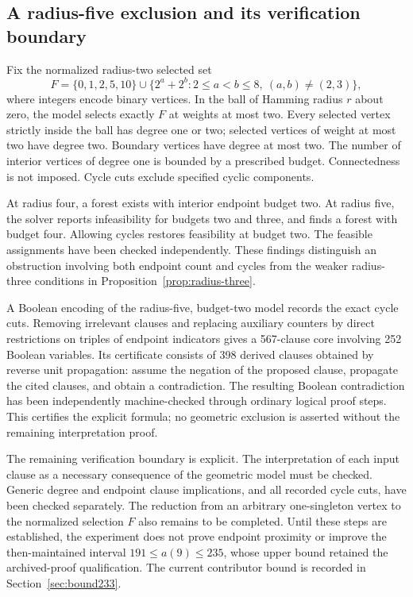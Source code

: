 \documentclass[11pt,a4paper]{article}
\theoremstyle{definition}
\theoremstyle{remark}
\begin{document}
\subsection{A radius-five exclusion and its verification boundary}
Fix the normalized radius-two selected set
\[
F=\{0,1,2,5,10\}\cup
\{2^a+2^b:2\le a<b\le8,\ (a,b)\ne(2,3)\},
\]
where integers encode binary vertices. In the ball of Hamming radius $r$ about zero, the model selects exactly $F$ at weights at most two. Every selected vertex strictly inside the ball has degree one or two; selected vertices of weight at most two have degree two. Boundary vertices have degree at most two. The number of interior vertices of degree one is bounded by a prescribed budget. Connectedness is not imposed. Cycle cuts exclude specified cyclic components.

At radius four, a forest exists with interior endpoint budget two. At radius five, the solver reports infeasibility for budgets two and three, and finds a forest with budget four. Allowing cycles restores feasibility at budget two. The feasible assignments have been checked independently. These findings distinguish an obstruction involving both endpoint count and cycles from the weaker radius-three conditions in Proposition~\ref{prop:radius-three}.

A Boolean encoding of the radius-five, budget-two model records the exact cycle cuts. Removing irrelevant clauses and replacing auxiliary counters by direct restrictions on triples of endpoint indicators gives a 567-clause core involving 252 Boolean variables. Its certificate consists of 398 derived clauses obtained by reverse unit propagation: assume the negation of the proposed clause, propagate the cited clauses, and obtain a contradiction. The resulting Boolean contradiction has been independently machine-checked through ordinary logical proof steps. This certifies the explicit formula; no geometric exclusion is asserted without the remaining interpretation proof.

The remaining verification boundary is explicit. The interpretation of each input clause as a necessary consequence of the geometric model must be checked. Generic degree and endpoint clause implications, and all recorded cycle cuts, have been checked separately. The reduction from an arbitrary one-singleton vertex to the normalized selection $F$ also remains to be completed. Until these steps are established, the experiment does not prove endpoint proximity or improve the then-maintained interval $191\le a(9)\le235$, whose upper bound retained the archived-proof qualification. The current contributor bound is recorded in Section~\ref{sec:bound233}.
\end{document}
